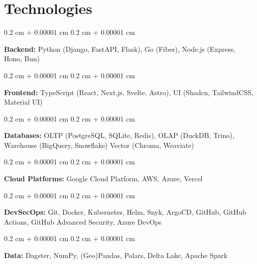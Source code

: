\documentclass[10pt, a4paper]{article}
\newenvironment{onecolentry}{
    \begin{adjustwidth}{
        0.2 cm + 0.00001 cm
    }{
        0.2 cm + 0.00001 cm
    }
}{
    \end{adjustwidth}
} %
\begin{document}
    
    \section{Technologies}



        
        \begin{onecolentry}
            \textbf{Backend:} Python (Django, FastAPI, Flask), Go (Fiber), Node.js (Express, Hono, Bun)
        \end{onecolentry}

        \vspace{0.2 cm}

        \begin{onecolentry}
            \textbf{Frontend:} TypeScript (React, Next.js, Svelte, Astro), UI (Shadcn, TailwindCSS, Material UI)
        \end{onecolentry}

        \vspace{0.2 cm}

        \begin{onecolentry}
            \textbf{Databases:} OLTP (PostgreSQL, SQLite, Redis), OLAP (DuckDB, Trino), Warehouse (BigQuery, Snowflake)  Vector (Chroma, Weaviate)

        \end{onecolentry}

        \vspace{0.2 cm}

        \begin{onecolentry}
            \textbf{Cloud Platforms:} Google Cloud Platform, AWS, Azure, Vercel
        \end{onecolentry}

        \vspace{0.2 cm}

        \begin{onecolentry}
            \textbf{DevSecOps:} Git, Docker, Kubernetes, Helm, Snyk, ArgoCD, GitHub, GitHub Actions, GitHub Advanced Security, Azure DevOps

        \end{onecolentry}

        \vspace{0.2 cm}

        \begin{onecolentry}
            \textbf{Data:} Dagster, NumPy, (Geo)Pandas, Polars, Delta Lake, Apache Spark
        \end{onecolentry}
\end{document}
